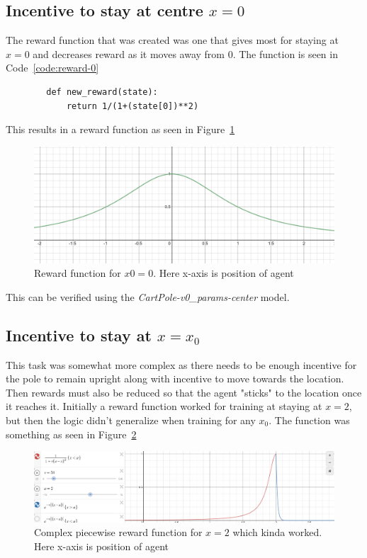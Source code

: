 \documentclass[a4paper]{article}
\newenvironment{code}{\captionsetup{type=listing}}{}
\begin{document}
\subsection{Incentive to stay at centre $x=0$}
    The reward function that was created was one that gives most for staying at $x=0$ and decreases reward as it moves away from 0. The function is seen in Code~\ref{code:reward-0}
    \begin{code}
        \label{code:reward-0}
    \begin{verbatim}
        def new_reward(state):
            return 1/(1+(state[0])**2) 
    \end{verbatim}
    \end{code}
    This results in a reward function as seen in Figure~\ref{fig:reward-0}
    \begin{figure}[ht!]
        \centering
        \includegraphics[width=\textwidth]{center.PNG}
        \caption{Reward function for $x0=0$. Here x-axis is position of agent}
        \label{fig:reward-0}
    \end{figure}
    This can be verified using the \textit{CartPole-v0\_params-center} model.
\subsection{Incentive to stay at $x=x_0$}
    This task was somewhat more complex as there needs to be enough incentive for the pole to remain upright along with incentive to move towards the location. Then rewards must also be reduced so that the agent "sticks" to the location once it reaches it.
    Initially a reward function worked for training at staying at $x=2$, but then the logic didn't generalize when training for any $x_0$. The function was something as seen in Figure~\ref{fig:kinda}
    \begin{figure}[ht!]
        \centering
        \includegraphics[width=\textwidth]{other_reward.PNG}
        \caption{Complex piecewise reward function for $x=2$ which kinda worked. Here x-axis is position of agent }
        \label{fig:kinda}
    \end{figure}  
\end{document}
